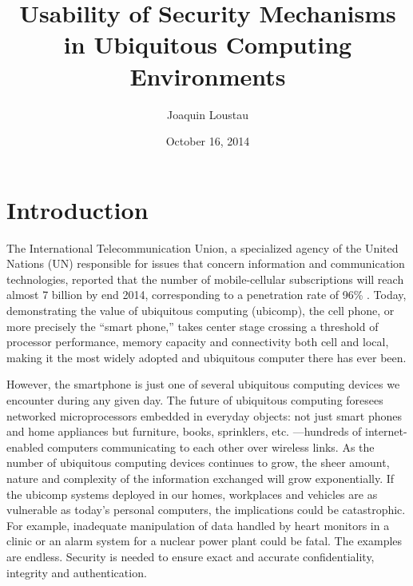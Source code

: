 \documentclass{article}
\title{Usability of Security Mechanisms in Ubiquitous Computing Environments}
\author{Joaquin Loustau}
\date{October 16, 2014}
\begin{document}
\maketitle


\pagebreak
\tableofcontents

\pagebreak

%
%
\section{Introduction}
\label{introduction}
The International Telecommunication Union, a specialized agency of the United Nations (UN) responsible for issues that concern information and communication technologies, reported that the number of mobile-cellular subscriptions will reach almost 7 billion by end 2014, corresponding to a penetration rate of 96\% . \cite{itu2014world} Today, demonstrating the value of ubiquitous computing (ubicomp), the cell phone, or more precisely the “smart phone,” takes center stage crossing a threshold of processor performance, memory capacity and connectivity both cell and local, making it the most widely adopted and ubiquitous computer there has ever been. 

However, the smartphone is just one of several ubiquitous computing devices we encounter during any given day. The future of ubiquitous computing foresees networked microprocessors embedded in everyday objects: not just smart phones and home appliances but furniture, books, sprinklers, etc. ---hundreds of internet-enabled computers communicating to each other over wireless links. 
As the number of ubiquitous computing devices continues to grow, the sheer amount, nature and complexity of the information exchanged will grow exponentially. If the ubicomp systems deployed in our homes, workplaces and vehicles are as vulnerable as today’s personal computers, the implications could be catastrophic. For example, inadequate manipulation of data handled by heart monitors in a clinic or an alarm system for a nuclear power plant could be fatal. The examples are endless. Security is needed to ensure exact and accurate confidentiality, integrity and authentication.
\end{document}
